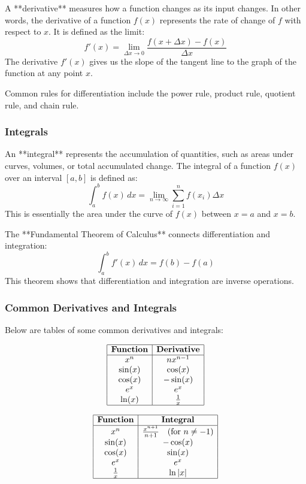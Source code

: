 \documentclass{article}
\begin{document}
A **derivative** measures how a function changes as its input changes. In other words, the derivative of a function \( f(x) \) represents the rate of change of \( f \) with respect to \( x \). It is defined as the limit:
\[
f'(x) = \lim_{\Delta x \to 0} \frac{f(x + \Delta x) - f(x)}{\Delta x}
\]
The derivative \( f'(x) \) gives us the slope of the tangent line to the graph of the function at any point \( x \).

Common rules for differentiation include the power rule, product rule, quotient rule, and chain rule.

\subsubsection*{Integrals}

An **integral** represents the accumulation of quantities, such as areas under curves, volumes, or total accumulated change. The integral of a function \( f(x) \) over an interval \( [a, b] \) is defined as:
\[
\int_a^b f(x) \, dx = \lim_{n \to \infty} \sum_{i=1}^{n} f(x_i) \Delta x
\]
This is essentially the area under the curve of \( f(x) \) between \( x = a \) and \( x = b \).

The **Fundamental Theorem of Calculus** connects differentiation and integration:
\[
\int_a^b f'(x) \, dx = f(b) - f(a)
\]
This theorem shows that differentiation and integration are inverse operations.

\subsubsection*{Common Derivatives and Integrals}

Below are tables of some common derivatives and integrals:

\[
\begin{array}{|c|c|}
\hline
\textbf{Function} & \textbf{Derivative} \\
\hline
x^n & n x^{n-1} \\
\sin(x) & \cos(x) \\
\cos(x) & -\sin(x) \\
e^x & e^x \\
\ln(x) & \frac{1}{x} \\
\hline
\end{array}
\]

\[
\begin{array}{|c|c|}
\hline
\textbf{Function} & \textbf{Integral} \\
\hline
x^n & \frac{x^{n+1}}{n+1} \quad \text{(for } n \neq -1) \\
\sin(x) & -\cos(x) \\
\cos(x) & \sin(x) \\
e^x & e^x \\
\frac{1}{x} & \ln|x| \\
\hline
\end{array}
\]
\end{document}
